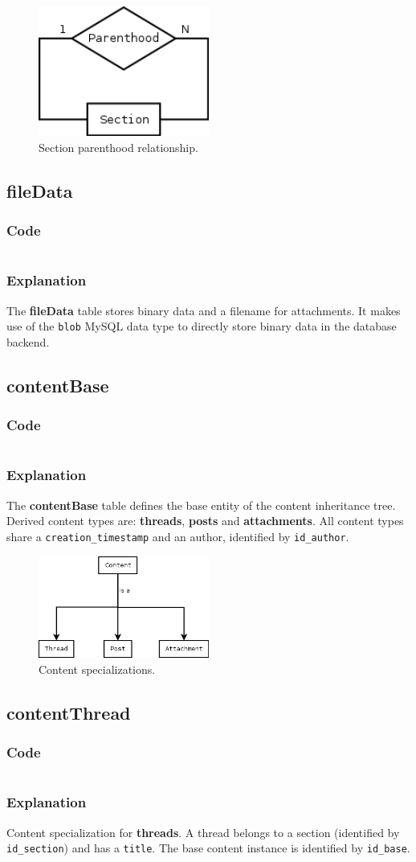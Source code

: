 \documentclass[12pt]{report}
\renewcommand\emph{\textbf}
\newcommand{\printSQLtest}[1]
{
    \inputminted[linenos, breaklines, breakbytoken, tabsize=4, fontsize=\footnotesize]{mysql}{#1}
}
\newcommand{\printSQLTablepage}[2]
{
    \newpage
    \subsection{#2}
    \subsubsection{Code}
    \printSQLtest{../sql/parts/#1}
    \subsubsection{Explanation}
}
\begin{document}
                    \begin{figure}[h]
                    \caption{Section parenthood relationship.}
                    \centering
                    \includegraphics[width=0.5\textwidth]{td/05section}
                    \end{figure}

                \printSQLTablepage{06_tblFileData.sql}{fileData}
                    The \emph{fileData} table stores binary data and a filename for attachments. It makes use of the \texttt{blob} MySQL data type to directly store binary data in the database backend.

                \printSQLTablepage{07_tblContentBase.sql}{contentBase}
                    The \emph{contentBase} table defines the base entity of the content inheritance tree. Derived content types are: \emph{threads}, \emph{posts} and \emph{attachments}.
                    All content types share a \texttt{creation_timestamp} and an author, identified by \texttt{id_author}.

                    \begin{figure}[h]
                    \caption{Content specializations.}
                    \centering
                    \includegraphics[width=0.5\textwidth]{td/07contentbase}
                    \end{figure}

                \printSQLTablepage{08_tblContentThread.sql}{contentThread}
                    Content specialization for \emph{threads}. A thread belongs to a section (identified by \texttt{id_section}) and has a \texttt{title}.
                    The base content instance is identified by \texttt{id_base}.
\end{document}
